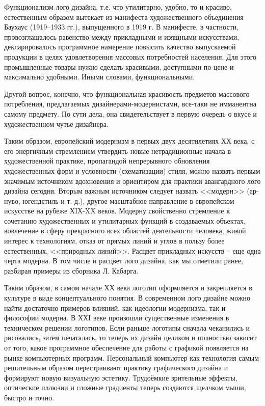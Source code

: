 Функционализм лого дизайна, т.е. что утилитарно, удобно, то и красиво, естественным образом вытекает
из манифеста художественного объединения Баухаус (1919--1933 гг.), выпущенного в 1919 г. В манифесте, в
частности, провозглашалось равенство между прикладными и изящными искусствами, декларировалось
программное намерение повысить качество выпускаемой продукции в целях удовлетворения массовых
потребностей населения. Для этого промышленные товары нужно сделать красивыми, доступными по цене и
максимально удобными. Иными словами, функциональными.

Другой вопрос, конечно, что функциональная красивость предметов массового потребления, предлагаемых
дизайнерами-модернистами, все-таки не имманентна самому предмету. По сути дела, она свидетельствует
в первую очередь о вкусе и художественном чутье дизайнера.

Таким образом, европейский модернизм в первых двух десятилетиях ХХ века, с его энергичным
стремлением утвердить новые нетрадиционные начала в художественной практике, пропагандой
непрерывного обновления художественных форм и условности (схематизации) стиля, можно назвать первым
значимым источником вдохновения и ориентиром для практики авангардного лого дизайна сегодня. Вторым
важным источником следует назвать <<модерн>> (ар-нуво, югендстиль и т. д.), другое масштабное
направление в европейском искусстве на рубеже ХIХ-XX веков. Модерну свойственно стремление к
сочетанию художественных и утилитарных функций в создаваемых объектах, вовлечение в сферу
прекрасного всех областей деятельности человека, живой интерес к технологиям, отказ от прямых линий
и углов в пользу более естественных, <<природных линий>>. Расцвет прикладных искусств -- еще одна черта
модерна. В том числе и расцвет лого дизайна, как мы отметили ранее, разбирая примеры из сборника
Л. Кабарга.

Таким образом, в самом начале ХХ века логотип оформляется и закрепляется в культуре в виде
концептуального понятия. В современном лого дизайне можно найти достаточно примеров влияний, как
идеологии модернизма, так и философии модерна. В ХХI веке произошли существенные изменения в
техническом решении логотипов. Если раньше логотипы сначала чеканились и рисовались, затем
печаталась, то теперь их дизайн целиком и полностью зависит от того, какое программное обеспечение
для работы с графикой появляется на рынке компьютерных программ. Персональный компьютер как
технология самым решительным образом перестраивают практику графического дизайна и формируют новую
визуальную эстетику. Трудоёмкие зрительные эффекты, оптические иллюзии и сложные градиенты теперь
создаются щелчком мыши, быстро и точно.

